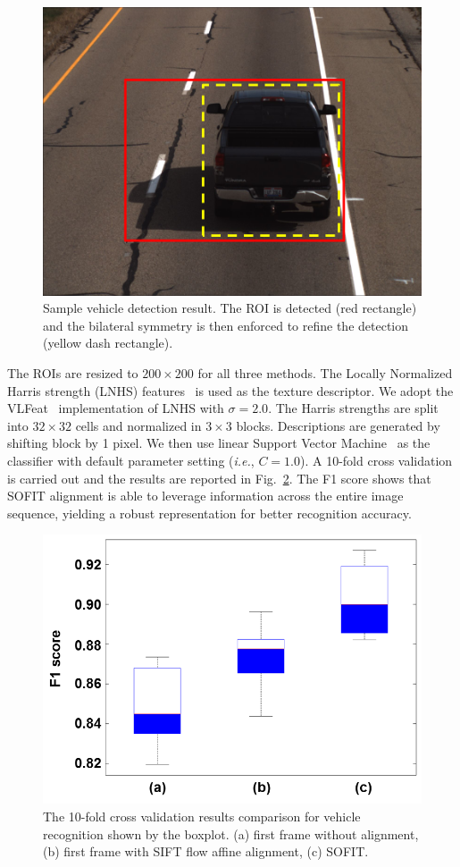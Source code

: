 \documentclass[10pt,journal]{IEEEtran}
\begin{document}
\begin{figure}[htbp]
	\centering
		\includegraphics[width=.9\columnwidth]{fig/vehicle_raw_data.png}
	\caption{Sample vehicle detection result. The ROI is detected (red rectangle) and the bilateral symmetry is then enforced to refine the detection (yellow dash rectangle).}
	\label{fig:vehicle_raw_data}
\end{figure}

The ROIs are resized to $200\times200$ for all three methods. The Locally Normalized Harris strength (LNHS) features~\cite{Pearce11} is used as the texture descriptor. We adopt the VLFeat~\cite{vlfeat} implementation of LNHS with $\sigma=2.0$. The Harris strengths are split into $32\times32$ cells and normalized in $3\times3$ blocks. Descriptions are generated by shifting block by 1 pixel. We then use linear Support Vector Machine~\cite{sklearn} as the classifier with default parameter setting (\textit{i.e.}, $C=1.0$). A 10-fold cross validation is carried out and the results are reported in Fig.~\ref{fig:fig_vehicle_cls_f1}. The F1 score shows that SOFIT alignment is able to leverage information across the entire image sequence, yielding a robust representation for better recognition accuracy. 

\begin{figure}[htbp]
	\centering
		\includegraphics[width=.6\columnwidth]{fig/vehicle_cls_f1.png}
	\caption{The 10-fold cross validation results comparison for vehicle recognition shown by the boxplot. (a) first frame without alignment, (b) first frame with SIFT flow affine alignment, (c) SOFIT.}
	\label{fig:fig_vehicle_cls_f1}
\end{figure}
\end{document}
